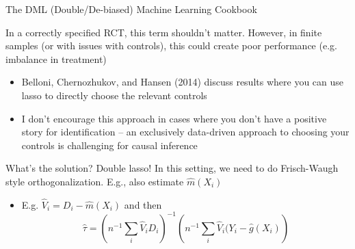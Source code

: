 \documentclass[notes,11pt, aspectratio=169]{beamer}
\newenvironment{wideitemize}{\itemize\addtolength{\itemsep}{10pt}}{\enditemize}
\begin{document}
\begin{frame}{The DML (Double/De-biased) Machine Learning Cookbook}
  \begin{wideitemize}
  \item In a correctly specified RCT, this term shouldn't
    matter. However, in finite samples (or with issues with controls),
    this could create poor performance (e.g. imbalance in treatment)
    \begin{itemize}
    \item Belloni, Chernozhukov, and Hansen (2014) discuss results
      where you can use lasso to directly choose the relevant controls
    \item I don't encourage this approach in cases where you don't
      have a positive story for identification -- an exclusively
      data-driven approach to choosing your controls is challenging
      for causal inference
    \end{itemize}
  \item What's the solution? Double lasso! In this setting, we need to
    do Frisch-Waugh style orthogonalization. E.g., also estimate
    $\hat{m}(X_{i})$
    \begin{itemize}
    \item E.g. $\hat{V}_{i} = D_{i} - \hat{m}(X_{i})$  and then
  $$\hat{\tau} = \left(n^{-1}\sum_{i}\hat{V}_{i}D_{i}\right)^{-1}\left(n^{-1}\sum_{i}\hat{V}_{i}(Y_{i} - \hat{g}(X_{i})\right)$$      
    \end{itemize}
  \end{wideitemize}
\end{frame}
\end{document}
